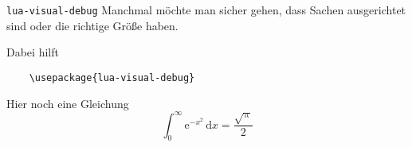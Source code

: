 \begin{frame}[fragile]{\texttt{lua-visual-debug}}
  Manchmal möchte man sicher gehen, dass Sachen ausgerichtet sind oder die richtige Größe haben.
  
  Dabei hilft
  \begin{lstlisting}
    \usepackage{lua-visual-debug}
  \end{lstlisting}

  \vspace{2\baselineskip}
  Hier noch eine Gleichung
  \begin{equation}
    \int_0^\infty \mathup{e}^{-x^2} \, \mathup{d}x = \frac{\sqrt{\mathup{\pi}}}{2}
  \end{equation}
\end{frame}
